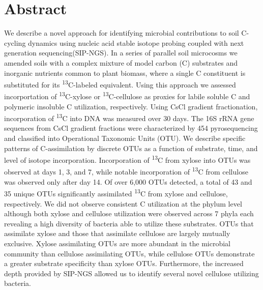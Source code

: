 \section{Abstract} 
We describe a novel approach for identifying microbial contributions to soil C-cycling dynamics using nucleic acid stable isotope probing coupled with next generation sequencing(SIP-NGS). In a series of parallel soil microcosms we amended soils with a complex mixture of model carbon (C) substrates and inorganic nutrients common to plant biomass, where a single C constituent is substituted for its \textsuperscript{13}C-labeled equivalent. Using this approach we assessed incorportation of \textsuperscript{13}C-xylose or \textsuperscript{13}C-cellulose as proxies for labile soluble C and polymeric insoluble C utilization, respectively. Using CsCl gradient fractionation, incorporation of \textsuperscript{13}C into DNA was measured over 30 days. The 16S rRNA gene sequences from CsCl gradient fractions were characterized by 454 pyrosequencing and classified into Operational Taxonomic Units (OTU). We describe specific patterns of C-assimilation by discrete OTUs as a function of substrate, time, and level of isotope incorporation. Incorporation of \textsuperscript{13}C from xylose into OTUs was observed at days 1, 3, and 7, while notable incorporation of \textsuperscript{13}C from cellulose was observed only after day 14. Of over 6,000 OTUs detected, a total of 43 and 35 unique OTUs significantly assimilated \textsuperscript{13}C from xylose and cellulose, respectively. We did not observe consistent C utilization at the phylum level although both xylose and cellulose utilization were observed across 7 phyla each revealing a high diversity of bacteria able to utilize these substrates. OTUs that assimilate xylose and those that assimilate cellulose are largely mutually exclusive. Xylose assimilating OTUs are more abundant in the microbial community than cellulose assimilating OTUs, while cellulose OTUs demonstrate a greater substrate specificity than xylose OTUs. Furthermore, the increased depth provided by SIP-NGS allowed us to identify several novel cellulose utilizing bacteria.        

